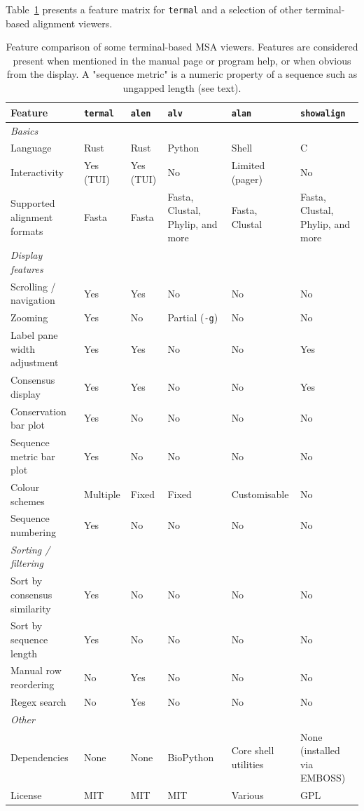 \documentclass[11pt]{article}
\begin{document}
Table~\ref{tbl:comparison} presents a feature matrix for \texttt{termal} and a
selection of other terminal-based alignment viewers.

\begin{landscape}
\begin{table}[ht]
\centering
\small
\begin{tabularx}{\linewidth}{lXXXXX}
\toprule
\textbf{Feature} & \textbf{\texttt{termal}} & \textbf{\texttt{alen}} & \textbf{\texttt{alv}} & \textbf{\texttt{alan}} & \textbf{\texttt{showalign}} \\
\midrule
\textit{Basics} \\
Language & Rust & Rust & Python & Shell & C \\
Interactivity & Yes (TUI) & Yes (TUI) & No & Limited (pager)  & No \\
Supported alignment formats & Fasta & Fasta & Fasta, Clustal, Phylip, and more
	& Fasta, Clustal & Fasta, Clustal, Phylip, and more\\
\midrule
\textit{Display features} \\
Scrolling / navigation & Yes & Yes & No & No & No \\
Zooming & Yes & No & Partial (\texttt{-g}) & No & No \\
Label pane width adjustment & Yes & Yes & No & No & Yes \\
Consensus display & Yes & Yes  & No & No & Yes \\
Conservation bar plot & Yes & No & No & No & No \\
Sequence metric bar plot & Yes  & No & No & No & No \\
Colour schemes & Multiple & Fixed & Fixed & Customisable & No \\
Sequence numbering & Yes & No & No & No & No \\
\midrule
\textit{Sorting / filtering} \\
Sort by consensus similarity & Yes & No & No & No & No \\
Sort by sequence length & Yes & No & No & No & No \\
Manual row reordering & No & Yes & No & No & No \\
Regex search & No & Yes & No & No & No \\
\midrule
\textit{Other} \\
	Dependencies & None  & None & BioPython & Core shell utilities & None (installed via EMBOSS) \\
	License & MIT & MIT & MIT & Various & GPL \\
\bottomrule
\end{tabularx}
\caption{%
Feature comparison of some terminal-based MSA viewers. Features are considered
	present when mentioned in the manual page or program help, or when obvious
	from the display. A "sequence metric" is a numeric property of a sequence such
	as ungapped length (see text).
}
\label{tbl:comparison}
\end{table}
\end{landscape}
\end{document}
